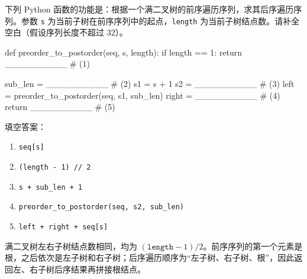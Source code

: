 \begin{question}[根据前序求后序]
下列 Python 函数的功能是：根据一个满二叉树的前序遍历序列，求其后序遍历序列。参数 \texttt{s} 为当前子树在前序序列中的起点，\texttt{length} 为当前子树结点数。请补全空白（假设序列长度不超过 $32$）。

\begin{pycode}
def preorder_to_postorder(seq, s, length):
    if length == 1:
        return __________                      # (1)

    sub_len = __________                       # (2)
    s1 = s + 1
    s2 = __________                            # (3)
    left = preorder_to_postorder(seq, s1, sub_len)
    right = __________                         # (4)
    return __________                          # (5)
\end{pycode}

\begin{solution}
填空答案：
\begin{enumerate}
  \item \texttt{seq[s]}
  \item \texttt{(length - 1) // 2}
  \item \texttt{s + sub\_len + 1}
  \item \texttt{preorder\_to\_postorder(seq, s2, sub\_len)}
  \item \texttt{left + right + seq[s]}
\end{enumerate}
满二叉树左右子树结点数相同，均为 $(\texttt{length}-1)/2$。前序序列的第一个元素是根，之后依次是左子树和右子树；后序遍历顺序为“左子树、右子树、根”，因此返回左、右子树后序结果再拼接根结点。
\end{solution}
\end{question}



